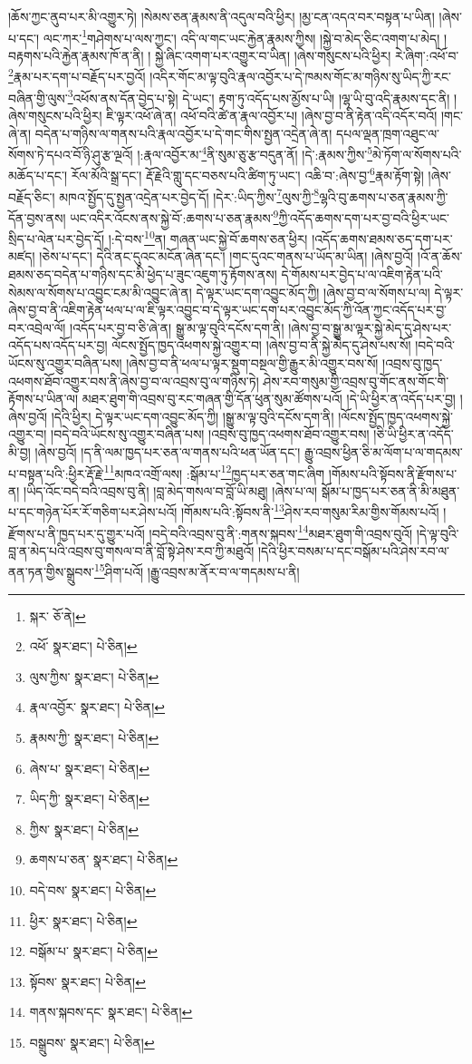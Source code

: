 །ཆོས་ཀྱང་ནུབ་པར་མི་འགྱུར་ཏེ། །སེམས་ཅན་རྣམས་ནི་འདུལ་བའི་ཕྱིར། །མྱ་ངན་འདའ་བར་བསྟན་པ་ཡིན། །ཞེས་པ་དང་། ལང་ཀར་\footnote{སྐར་  ཅོ་ནེ། }གཤེགས་པ་ལས་ཀྱང་། འདི་ལ་གང་ཡང་རྐྱེན་རྣམས་ཀྱིས། །སྐྱེ་བ་མེད་ཅིང་འགག་པ་མེད། །བརྟགས་པའི་རྐྱེན་རྣམས་ཁོ་ན་ནི། །
སྐྱེ་ཞིང་འགག་པར་འགྱུར་བ་ཡིན། །ཞེས་གསུངས་པའི་ཕྱིར། རེ་ཞིག་:འཕོ་བ་\footnote{འཕོ་  སྣར་ཐང་།  པེ་ཅིན། }རྣམ་པར་དག་པ་བརྗོད་པར་བྱའོ། །འདིར་གོང་མ་ལྟ་བུའི་རྣལ་འབྱོར་པ་དེ་ཁམས་གོང་མ་གཉིས་སུ་ཡིད་ཀྱི་རང་བཞིན་གྱི་ལུས་\footnote{ལུས་ཀྱིས་  སྣར་ཐང་།  པེ་ཅིན། }འཕོས་ནས་དོན་བྱེད་པ་སྟེ། དེ་ཡང་། རྟག་ཏུ་འདོད་པས་མྱོས་པ་ཡི། །ལྷ་ཡི་བུ་འདི་རྣམས་དང་ནི། །ཞེས་གསུངས་པའི་ཕྱིར། ཇི་ལྟར་འཕོ་ཞེ་ན། འཕོ་བའི་ཚེ་ན་རྣལ་འབྱོར་པ། །ཞེས་བྱ་བ་ནི་རྟེན་འདི་འདོར་བའོ། །གང་ཞེ་ན། བདེན་པ་གཉིས་ལ་གནས་པའི་རྣལ་འབྱོར་པ་དེ་གང་གིས་སྤྱན་འདྲེན་ཞེ་ན། དཔལ་ལྡན་ཁྲག་འཐུང་ལ་སོགས་ཏེ་དཔའ་བོ་ཉི་ཤུ་རྩ་ལྔའོ། །:རྣལ་འབྱོར་མ་\footnote{རྣལ་འབྱོར་  སྣར་ཐང་།  པེ་ཅིན། }ནི་སུམ་ཅུ་རྩ་བདུན་ནོ། །དེ་:རྣམས་ཀྱིས་\footnote{རྣམས་ཀྱི་  སྣར་ཐང་།  པེ་ཅིན། }མེ་ཏོག་ལ་སོགས་པའི་མཆོད་པ་དང་། རོལ་མོའི་སྒྲ་དང་། རྡོ་རྗེའི་གླུ་དང་བཅས་པའི་ཚིག་ཏུ་ཡང་། འཆི་བ་:ཞེས་བྱ་\footnote{ཞེས་པ་  སྣར་ཐང་།  པེ་ཅིན། }རྣམ་རྟོག་སྟེ། །ཞེས་བརྗོད་ཅིང་། མཁའ་སྤྱོད་དུ་སྤྱན་འདྲེན་པར་བྱེད་དོ། །དེར་:ཡིད་ཀྱིས་\footnote{ཡིད་ཀྱི་  སྣར་ཐང་།  པེ་ཅིན། }ལུས་ཀྱི་\footnote{ཀྱིས་  སྣར་ཐང་།  པེ་ཅིན། }ལྷའི་བུ་ཆགས་པ་ཅན་རྣམས་ཀྱི་དོན་བྱས་ནས། ཡང་འདིར་འོངས་ནས་སྐྱེ་བོ་:ཆགས་པ་ཅན་རྣམས་\footnote{ཆགས་པ་ཅན་  སྣར་ཐང་།  པེ་ཅིན། }ཀྱི་འདོད་ཆགས་དག་པར་བྱ་བའི་ཕྱིར་ཡང་སྲིད་པ་ལེན་པར་བྱེད་དོ། །:དེ་བས་\footnote{བདེ་བས་  སྣར་ཐང་།  པེ་ཅིན། }ན། གཞན་ཡང་སྐྱེ་བོ་ཆགས་ཅན་ཕྱིར། །འདོད་ཆགས་ཐམས་ཅད་དག་པར་མཛད། །ཅེས་པ་དང་། དེའི་ནང་དུའང་མངོན་ཞེན་དང་། །གང་དུའང་གནས་པ་ཡོད་མ་ཡིན། །ཞེས་བྱའོ། །འོ་ན་ཆོས་ཐམས་ཅད་བདེན་པ་གཉིས་དང་མི་ཕྱེད་པ་ཟུང་འཇུག་ཏུ་རྟོགས་ནས། དེ་གོམས་པར་བྱེད་པ་ལ་འཇིག་རྟེན་པའི་སེམས་ལ་སོགས་པ་འབྱུང་ངམ་མི་འབྱུང་ཞེ་ན། དེ་ལྟར་ཡང་དག་འབྱུང་མོད་ཀྱི། །ཞེས་བྱ་བ་ལ་སོགས་པ་ལ། དེ་ལྟར་ཞེས་བྱ་བ་ནི་འཇིག་རྟེན་ཕལ་པ་ལ་ཇི་ལྟར་འབྱུང་བ་དེ་ལྟར་ཡང་དག་པར་འབྱུང་མོད་ཀྱི་འོན་ཀྱང་འདོད་པར་བྱ་བར་འབྲེལ་ལོ། །འདོད་པར་བྱ་བ་ཅི་ཞེ་ན། སྒྱུ་མ་ལྟ་བུའི་དངོས་དག་ནི། །ཞེས་བྱ་བ་སྒྱུ་མ་ལྟར་སྐྱེ་མེད་དུ་ཤེས་པར་འདོད་པས་འདོད་པར་བྱ། ལོངས་སྤྱོད་ཁྱད་འཕགས་སྐྱེ་འགྱུར་བ། །ཞེས་བྱ་བ་ནི་སྐྱེ་མེད་དུ་ཤེས་པས་སོ། །བདེ་བའི་ཡོངས་སུ་འགྱུར་བཞིན་པས། །ཞེས་བྱ་བ་ནི་ཕལ་པ་ལྟར་སྡུག་བསྔལ་གྱི་རྒྱུར་མི་འགྱུར་བས་སོ། །འབྲས་བུ་ཁྱད་འཕགས་ཐོབ་འགྱུར་བས་ནི་ཞེས་བྱ་བ་ལ་འབྲས་བུ་ལ་གཉིས་ཏེ། ཤེས་རབ་གསུམ་གྱི་འབྲས་བུ་གོང་ནས་གོང་གི་རྟོགས་པ་ཡིན་ལ། མཐར་ཐུག་གི་འབྲས་བུ་རང་གཞན་གྱི་དོན་ཕུན་སུམ་ཚོགས་པའོ། །དེ་ཡི་ཕྱིར་ན་འདོད་པར་བྱ། །ཞེས་བྱའོ། །དེའི་ཕྱིར། དེ་ལྟར་ཡང་དག་འབྱུང་མོད་ཀྱི། །སྒྱུ་མ་ལྟ་བུའི་དངོས་དག་ནི། །ལོངས་སྤྱོད་ཁྱད་འཕགས་སྐྱེ་འགྱུར་བ། །བདེ་བའི་ཡོངས་སུ་འགྱུར་བཞིན་པས། །འབྲས་བུ་ཁྱད་འཕགས་ཐོབ་འགྱུར་བས། །ཅི་ཡི་ཕྱིར་ན་འདོད་མི་བྱ། །ཞེས་བྱའོ། །ད་ནི་ལམ་ཁྱད་པར་ཅན་ལ་གནས་པའི་ཕན་ཡོན་དང་། རྒྱུ་འབྲས་ཕྱིན་ཅི་མ་ལོག་པ་ལ་གདམས་པ་བསྟན་པའི་:ཕྱིར་རྡོ་རྗེ་\footnote{ཕྱིར་  སྣར་ཐང་།  པེ་ཅིན། }མཁའ་འགྲོ་ལས། :སྒོམ་པ་\footnote{བསྒོམ་པ་  སྣར་ཐང་།  པེ་ཅིན། }ཁྱད་པར་ཅན་གང་ཞིག །གོམས་པའི་སྟོབས་ནི་རྫོགས་པ་ན། །ཡིད་འོང་བདེ་བའི་འབྲས་བུ་ནི། །བླ་མེད་གསལ་བ་བློ་ཡི་མཐུ། །ཞེས་པ་ལ། སྒོམ་པ་ཁྱད་པར་ཅན་ནི་མི་མཐུན་པ་དང་གཉེན་པོར་རོ་གཅིག་པར་ཤེས་པའོ། །གོམས་པའི་:སྟོབས་ནི་\footnote{སྟོབས་  སྣར་ཐང་།  པེ་ཅིན། }ཤེས་རབ་གསུམ་རིམ་གྱིས་གོམས་པའོ། །རྫོགས་པ་ནི་ཁྱད་པར་དུ་གྱུར་པའོ། །བདེ་བའི་འབྲས་བུ་ནི་:གནས་སྐབས་\footnote{གནས་སྐབས་དང་  སྣར་ཐང་།  པེ་ཅིན། }མཐར་ཐུག་གི་འབྲས་བུའོ། །དེ་ལྟ་བུའི་བླ་ན་མེད་པའི་འབྲས་བུ་གསལ་བ་ནི་བློ་སྟེ་ཤེས་རབ་ཀྱི་མཐུའོ། །དེའི་ཕྱིར་བསམ་པ་དང་བསྒོམ་པའི་ཤེས་རབ་ལ་ནན་ཏན་གྱིས་སྒྲུབས་\footnote{བསྒྲུབས་  སྣར་ཐང་།  པེ་ཅིན། }ཤིག་པའོ། །རྒྱུ་འབྲས་མ་ནོར་བ་ལ་གདམས་པ་ནི། 